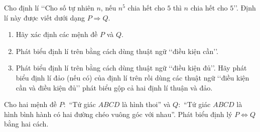 \begin{vd}
	Cho định lí \lq\lq Cho số tự nhiên $n$, nếu $n^5$ chia hết cho $5$ thì $n$ chia hết cho $5$\rq\rq. Định lí này được viết dưới dạng $P\Rightarrow Q$.
	\begin{enumerate}
		\item Hãy xác định các mệnh đề $P$ và $Q$.
		\item Phát biểu định lí trên bằng cách dùng thuật ngữ \lq\lq điều kiện cần\rq\rq.
		\item Phát biểu định lí trên bằng cách dùng thuật ngữ \lq\lq điều kiện đủ\rq\rq.
		Hãy phát biểu định lí đảo (nếu có) của định lí trên rồi dùng các thuật ngữ \lq\lq điều kiện cần và điều kiện đủ\rq\rq\text{} phát biểu gộp cả hai định lí thuận và đảo.
	\end{enumerate}
\end{vd}

\begin{vd}
	Cho hai mệnh đề $P:$ ``Tứ giác $ABCD$ là hình thoi'' và $Q:$ ``Tứ giác $ABCD$ là hình bình hành có hai đường chéo vuông góc với nhau''. Phát biểu định lý $P\Leftrightarrow Q$ bằng hai cách.
\end{vd}

